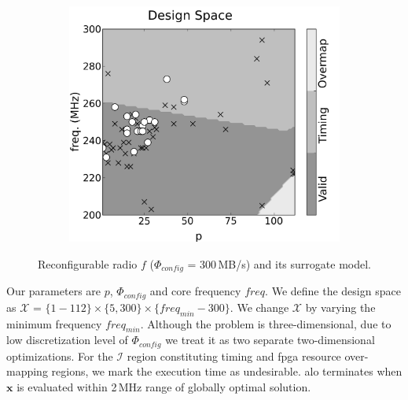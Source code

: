 \documentclass[runningheads,a4paper]{llncs}
\begin{document}
\begin{figure}
        \begin{subfigure}{0.32\textwidth}
                \centering
                \includegraphics[width=\textwidth]{./figs/svm025_44.png}
        \end{subfigure}
        \caption{Reconfigurable radio $f$ ($\Phi_{config}$ = 300\,MB/s) and its surrogate model.}\label{fig:fitness_1}
\end{figure}

Our parameters are $p$, $\Phi_{config}$ and core frequency $freq$. We define the design space as $\mathcal{X}$ = $\{1-112\} \times \{5,300\} \times \{freq_{min}-300\}$.  We change $\mathcal{X}$ by varying the minimum frequency $freq_{min}$. Although the problem is three-dimensional, due to low discretization level of $\Phi_{config}$ we treat it as two separate two-dimensional optimizations. For the $\mathcal{I}$  region constituting timing and \ac{fpga} resource over-mapping regions, we mark the execution time as undesirable. \ac{alo} terminates when $\mathbf{x}$ is evaluated within 2\,MHz range of globally optimal solution. 



%
\end{document}
